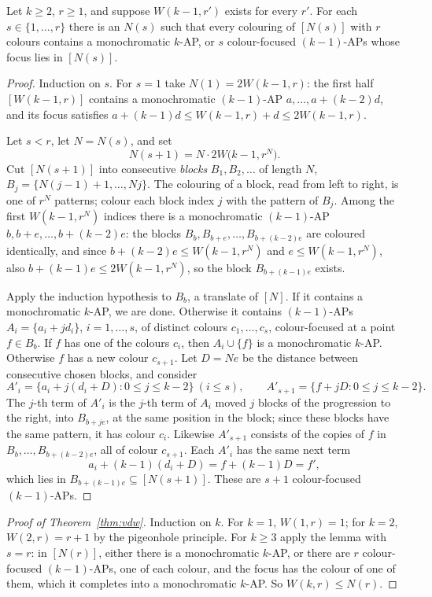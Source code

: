 \begin{lemma}\label{lem:focus}
Let $k\ge2$, $r\ge1$, and suppose $W(k-1,r')$ exists for every $r'$. For each $s\in\{1,\dots,r\}$ there is an $N(s)$ such that every colouring of $[N(s)]$ with $r$ colours
contains a monochromatic $k$-AP, or $s$ colour-focused $(k-1)$-APs whose focus lies in $[N(s)]$.
\end{lemma}
\begin{proof}
Induction on $s$. For $s=1$ take $N(1)=2W(k-1,r)$: the first half $[W(k-1,r)]$ contains a monochromatic $(k-1)$-AP $a,\dots,a+(k-2)d$, and its focus satisfies
$a+(k-1)d\le W(k-1,r)+d\le2W(k-1,r)$.

Let $s<r$, let $N=N(s)$, and set
\[
N(s+1)=N\cdot2W\bigl(k-1,r^{N}\bigr).
\]
Cut $[N(s+1)]$ into consecutive \emph{blocks} $B_1,B_2,\dots$ of length $N$, $B_j=\{N(j-1)+1,\dots,Nj\}$. The colouring of a block, read from left to right, is one of $r^{N}$
patterns; colour each block index $j$ with the pattern of $B_j$. Among the first $W(k-1,r^{N})$ indices there is a monochromatic $(k-1)$-AP $b,b+e,\dots,b+(k-2)e$: the
blocks $B_b,B_{b+e},\dots,B_{b+(k-2)e}$ are coloured identically, and since $b+(k-2)e\le W(k-1,r^{N})$ and $e\le W(k-1,r^{N})$, also $b+(k-1)e\le2W(k-1,r^{N})$, so the block
$B_{b+(k-1)e}$ exists.

Apply the induction hypothesis to $B_b$, a translate of $[N]$. If it contains a monochromatic $k$-AP, we are done. Otherwise it contains $(k-1)$-APs
$A_i=\{a_i+jd_i\}$, $i=1,\dots,s$, of distinct colours $c_1,\dots,c_s$, colour-focused at a point $f\in B_b$. If $f$ has one of the colours $c_i$, then $A_i\cup\{f\}$ is a monochromatic $k$-AP. Otherwise $f$ has a new colour $c_{s+1}$. Let $D=Ne$ be the distance between
consecutive chosen blocks, and consider
\[
A'_i=\{a_i+j(d_i+D):0\le j\le k-2\}\ (i\le s),\qquad A'_{s+1}=\{f+jD:0\le j\le k-2\}.
\]
The $j$-th term of $A'_i$ is the $j$-th term of $A_i$ moved $j$ blocks of the progression to the right, into $B_{b+je}$, at the same position in the block; since these blocks have
the same pattern, it has colour $c_i$. Likewise $A'_{s+1}$ consists of the copies of $f$ in $B_b,\dots,B_{b+(k-2)e}$, all of colour $c_{s+1}$. Each $A'_i$ has the same next term
\[
a_i+(k-1)(d_i+D)=f+(k-1)D=f',
\]
which lies in $B_{b+(k-1)e}\subseteq[N(s+1)]$. These are $s+1$ colour-focused $(k-1)$-APs.
\end{proof}

\begin{proof}[Proof of Theorem~\ref{thm:vdw}]
Induction on $k$. For $k=1$, $W(1,r)=1$; for $k=2$, $W(2,r)=r+1$ by the pigeonhole principle. For $k\ge3$ apply the lemma with $s=r$: in $[N(r)]$, either there is a
monochromatic $k$-AP, or there are $r$ colour-focused $(k-1)$-APs, one of each colour, and the focus has the colour of one of them, which it completes into a
monochromatic $k$-AP. So $W(k,r)\le N(r)$.
\end{proof}

